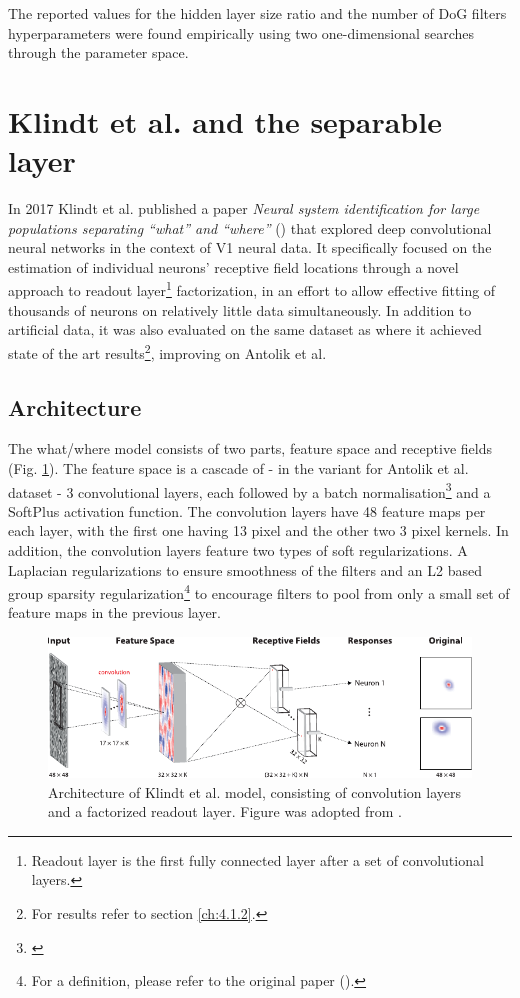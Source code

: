 The reported values for the hidden layer size ratio and the number of DoG filters hyperparameters were found empirically using two one-dimensional searches through the parameter space.

\section{Klindt et al. and the separable layer}\label{ch:2.2}

In 2017 Klindt et al. published a paper \textit{Neural system identification for large populations separating “what” and “where”} (\cite{klindt}) that explored deep convolutional neural networks in the context of V1 neural data. It specifically focused on the estimation of individual neurons’ receptive field locations through a novel approach to readout layer\footnote{Readout layer is the first fully connected layer after a set of convolutional layers.} factorization, in an effort to allow effective fitting of thousands of neurons on relatively little data simultaneously. In addition to artificial data, it was also evaluated on the same dataset as \cite{antolik} where it achieved state of the art results\footnote{For results refer to section \ref{ch:4.1.2}.}, improving on Antolik et al.

\subsection{Architecture}

The what/where model consists of two parts, feature space and receptive fields (Fig. \ref{fig:2.2}). The feature space is a cascade of - in the variant for Antolik et al. dataset - 3 convolutional layers, each followed by a batch normalisation\footnote{\citep{2015arXiv150203167I}} and a SoftPlus activation function. The convolution layers have 48 feature maps per each layer, with the first one having 13 pixel and the other two 3 pixel kernels. In addition, the convolution layers feature two types of soft regularizations. A Laplacian regularizations to ensure smoothness of the filters and an L2 based group sparsity regularization\footnote{For a definition, please refer to the original paper (\cite{klindt}).} to encourage filters to pool from only a small set of feature maps in the previous layer.

\begin{figure}[h]
    \centering
    \includegraphics[width=1\textwidth]{../figures/02_fig2}
    \caption[klindt et al. model]{Architecture of Klindt et al. model, consisting of convolution layers and a factorized readout layer. Figure was adopted from \cite{klindt}.}
    \label{fig:2.2}
\end{figure}

